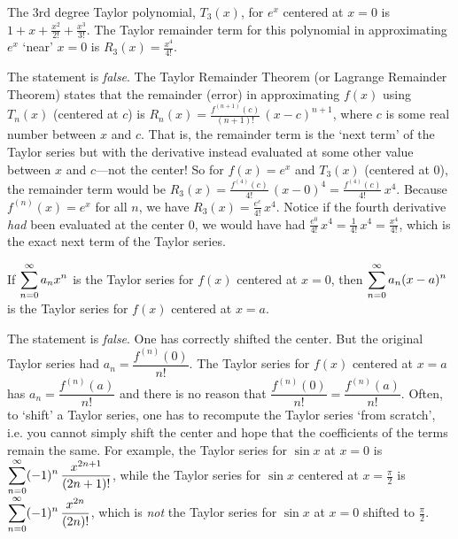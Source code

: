 \documentclass[11pt,letterpaper]{article}
\begin{document}
 The 3rd degree Taylor polynomial, $T_3(x)$, for $e^x$ centered at $x= 0$ is $1 + x + \frac{x^2}{2!} + \frac{x^3}{3!}$. The Taylor remainder term for this polynomial in approximating $e^x$ `near' $x= 0$ is $R_3(x)= \frac{x^4}{4!}$. \pspace

\sol The statement is \textit{false}. The Taylor Remainder Theorem (or Lagrange Remainder Theorem) states that the remainder (error) in approximating $f(x)$ using $T_n(x)$ (centered at $c$) is $R_n(x)= \frac{f^{(n+1)}(c)}{(n+1)!} \,(x - c)^{n+1}$, where $c$ is some real number between $x$ and $c$. That is, the remainder term is the `next term' of the Taylor series but with the derivative instead evaluated at some other value between $x$ and $c$---not the center! So for $f(x)= e^x$ and $T_3(x)$ (centered at $0$), the remainder term would be $R_3(x)= \frac{f^{(4)}(c)}{4!}\, (x - 0)^4= \frac{f^{(4)}(c)}{4!}\, x^4$. Because $f^{(n)}(x)= e^x$ for all $n$, we have $R_3(x)= \frac{e^c}{4!}\, x^4$. Notice if the fourth derivative \textit{had} been evaluated at the center $0$, we would have had $\frac{e^0}{4!}\, x^4= \frac{1}{4!}\, x^4= \frac{x^4}{4!}$, which is the exact next term of the Taylor series. \pvspace{1.3cm}



 If $\displaystyle\sum_{n=0}^\infty a_n x^n$ is the Taylor series for $f(x)$ centered at $x= 0$, then $\displaystyle\sum_{n=0}^\infty a_n (x - a)^n$ is the Taylor series for $f(x)$ centered at $x= a$. \pspace

\sol The statement is \textit{false}. One has correctly shifted the center. But the original Taylor series had $a_n= \dfrac{f^{(n)}(0)}{n!}$. The Taylor series for $f(x)$ centered at $x= a$ has $a_n= \dfrac{f^{(n)}(a)}{n!}$ and there is no reason that $\dfrac{f^{(n)}(0)}{n!}= \dfrac{f^{(n)}(a)}{n!}$. Often, to `shift' a Taylor series, one has to recompute the Taylor series `from scratch', i.e. you cannot simply shift the center and hope that the coefficients of the terms remain the same. For example, the Taylor series for $\sin x$ at $x= 0$ is $\displaystyle\sum_{n=0}^\infty (-1)^n\, \dfrac{x^{2n + 1}}{(2n + 1)!}$, while the Taylor series for $\sin x$ centered at $x= \frac{\pi}{2}$ is $\displaystyle\sum_{n=0}^\infty (-1)^n\, \dfrac{x^{2n}}{(2n)!}$, which is \textit{not} the Taylor series for $\sin x$ at $x= 0$ shifted to $\frac{\pi}{2}$. 
\end{document}
